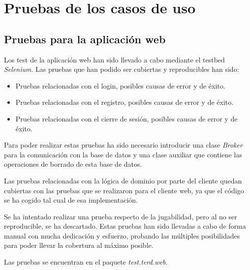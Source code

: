 \section{Pruebas de los casos de uso}

\subsection{Pruebas para la aplicación web}

Los test de la aplicación web han sido llevado a cabo mediante el testbed \emph{Selenium}. Las pruebas que han podido ser cubiertas y reproducibles han sido:

\begin{itemize}
\item Pruebas relacionadas con el login, posibles causas de error y de éxito.
\item Pruebas relacionadas con el registro, posibles causas de error y de éxito.
\item Pruebas relacionadas con el cierre de sesión, posibles causas de error y de éxito.
\end{itemize}

Para poder realizar estas pruebas ha sido necesario introducir una clase \emph{Broker} para la comunicación con la base de datos y una clase auxiliar que contiene las operaciones de borrado de esta base de datos.

Las pruebas relacionadas con la lógica de dominio por parte del cliente quedan cubiertas con las pruebas que se realizaron para el cliente web, ya que el código se ha cogido tal cual de esa implementación.

Se ha intentado realizar una prueba respecto de la jugabilidad, pero al no ser reproducible, se ha descartado. Estas pruebas han sido llevadas a cabo de forma manual con mucha dedicación y esfuerzo, probando las múltiples posibilidades para poder llevar la cobertura al máximo posible.

Las pruebas se encuentran en el paquete \emph{test.terd.web}.
